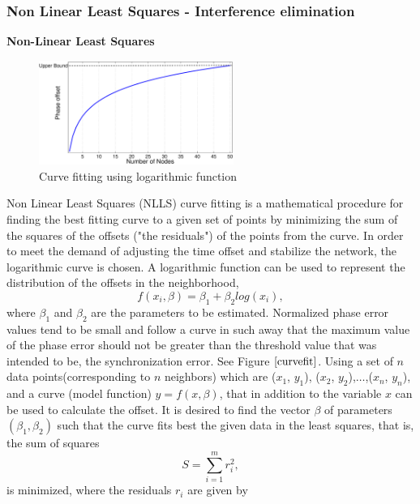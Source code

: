 \documentclass[journal]{IEEEtran}
\begin{document}
\subsubsection{\textbf{Non Linear Least Squares - Interference
elimination}}
\textbf{Non-Linear Least Squares} \newline
\begin{figure}[b]
\centering
\includegraphics[width=2.5in]{curvefit}
\caption{Curve fitting using logarithmic function} \label{curvefit}
\end{figure}
Non Linear Least Squares (NLLS) curve fitting  is a mathematical procedure for
finding the best fitting curve to a given set of points by
minimizing the sum of the squares of the offsets ("the residuals")
of the points from the curve. \newline
In order to meet the demand of adjusting the time offset and stabilize the network, the logarithmic curve is chosen. A logarithmic function can be used to represent the distribution of the offsets in the neighborhood,
\begin{equation}
 f(x_i,\beta)= \beta _1 + \beta_2log(x_i),
\end{equation}
where $\beta_1$ and $\beta_2$ are the parameters to be estimated.\newline
Normalized phase error values tend to be small and follow a curve in such away that the maximum value of the phase error should not be greater than the threshold value that was intended to be, the synchronization error. See Figure $\ref{curvefit}$.
\newline
Using a set of $n$ data points(corresponding to $n$ neighbors) which are ($x_1$, $y_1$),
($x_2$, $y_2$),$\dots$,($x_n$, $y_n$), and a curve (model function)
$y= f(x, \beta)$, that in addition to the variable $x$ can be used to calculate the offset.
\newline
It is desired to find the vector $\beta$ of parameters $(\beta_1, \beta_2)$ such that the curve fits best the given data in the least squares, that is, the sum of squares
\begin{equation}
    S=\sum_{i=1}^{m}r_i^2 ,
\end{equation}
is minimized, where the residuals $r_i$ are given by
\end{document}
